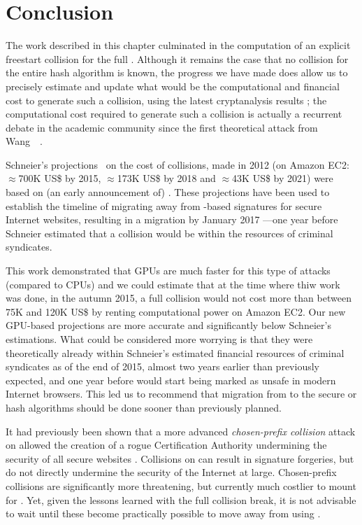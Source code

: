 \section{Conclusion}
\label{sec:conclusion}

The work described in this chapter culminated in the computation of an explicit freestart collision for the full \shaone. Although it remains the case that no collision for the entire hash algorithm is known,
the progress we have made does allow us to precisely estimate and update what would be the computational and financial cost to generate such a collision, using the latest cryptanalysis results \cite{DBLP:conf/eurocrypt/Stevens13};
the computational cost required to generate such a collision is actually a recurrent debate in the academic community since the first theoretical attack from Wang~\etal~\cite{DBLP:conf/crypto/WangYY05a}.

Schneier's projections~\cite{schneierSHA1} on the cost of \shaone collisions, made in 2012 (on Amazon EC2: $\approx$700K US\$ by 2015, $\approx$173K US\$ by 2018 and $\approx$43K US\$ by 2021) were based on
(an early announcement of) \cite{DBLP:conf/eurocrypt/Stevens13}. These projections have been used to establish the timeline of migrating away from \shaone-based signatures for secure Internet websites,
resulting in a migration by January 2017 ---one year before Schneier estimated that a \shaone collision would be within the resources of criminal syndicates. 

This work demonstrated that GPUs are much faster for this type of attacks (compared to CPUs)
and we could estimate that at the time where thiw work was done, in the autumn 2015, a full \shaone collision would not cost more than between 75K and 120K US\$ by renting computational power on Amazon EC2.
Our new GPU-based projections are more accurate and significantly below Schneier's estimations. What could be considered more worrying
is that they were theoretically already within Schneier's estimated financial resources of criminal syndicates as of the end of 2015,
almost two years earlier than previously expected, and one year before \shaone would start being marked as unsafe in modern Internet browsers.
This led us to recommend that migration from \shaone to the secure \shatwo or \shathree hash algorithms should be done sooner than previously planned.

It had previously been shown that a more advanced \emph{chosen-prefix collision} attack on \mdfive allowed the creation of a rogue Certification Authority undermining the security of all secure websites \cite{DBLP:conf/crypto/StevensSALMOW09}. 
Collisions on \shaone can result in \eg{} signature forgeries, but do not directly undermine the security of the Internet at large. Chosen-prefix collisions
are significantly more threatening, but currently much costlier to mount for \shaone. Yet, given the lessons learned with the \mdfive full collision break, it is not advisable to wait until these become practically possible
to move away from using \shaone.

